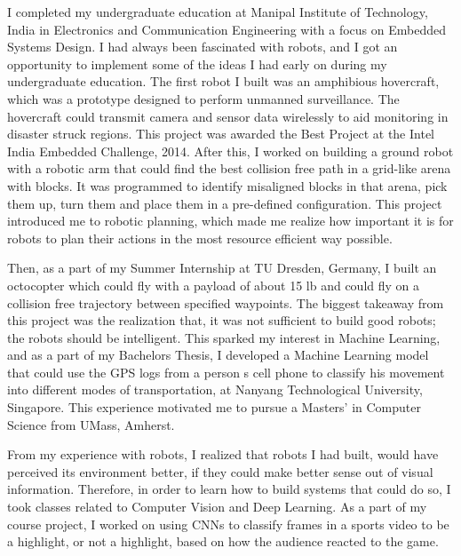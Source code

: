 \documentclass[10pt]{article}
\begin{document}
I completed my undergraduate education at Manipal Institute of Technology, India in Electronics and Communication Engineering with a focus on Embedded Systems Design. I had always been fascinated with robots, and I got an opportunity to implement some of the ideas I had early on during my undergraduate education. The first robot I built was an amphibious hovercraft, which was a prototype designed to perform unmanned surveillance. The hovercraft could transmit camera and sensor data wirelessly to aid monitoring in disaster struck regions. This project was awarded the Best Project at the Intel India Embedded Challenge, 2014. After this, I worked on building a ground robot with a robotic arm that could find the best collision free path in a grid-like arena with blocks. It was programmed to identify misaligned blocks in that arena, pick them up, turn them and place them in a pre-defined configuration. This project introduced me to robotic planning, which made me realize how important it is for robots to plan their actions in the most resource efficient way possible.
\par
Then, as a part of my Summer Internship at TU Dresden, Germany, I built an octocopter which could fly with a payload of about 15 lb and could fly on a collision free trajectory between specified waypoints. The biggest takeaway from this project was the realization that, it was not sufficient to build good robots; the robots should be intelligent. This sparked my interest in Machine Learning, and as a part of my Bachelor\textquotesingle s Thesis, I developed a Machine Learning model that could use the GPS logs from a person \textquotesingle s cell phone to classify his movement into different modes of transportation, at Nanyang Technological University, Singapore. This experience  motivated me to pursue a Masters' in Computer Science from UMass, Amherst.
\par
 From my experience with robots, I realized that robots I had built, would have perceived its environment better, if they could make better sense out of visual information. Therefore, in order to learn how to build systems that could do so, I took classes related to Computer Vision and Deep Learning. As a part of my course project, I worked on using CNNs to classify frames in a sports video to be a highlight, or not a highlight, based on how the audience reacted to the game. 
\end{document}
